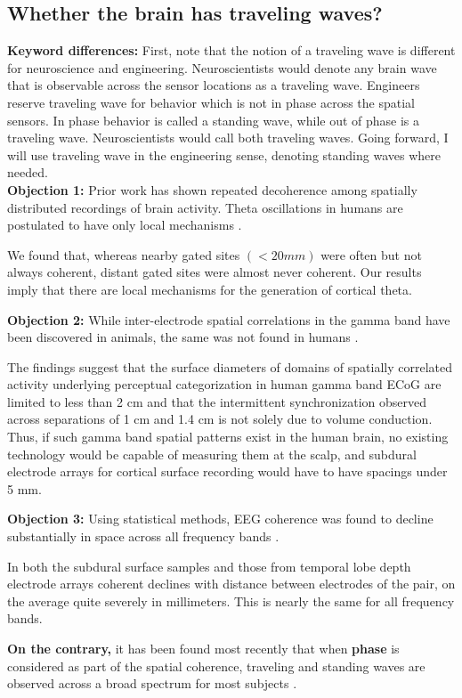 \subsection{Whether the brain has traveling waves?}
\textbf{Keyword differences:} First, note that the notion of a traveling wave is different for neuroscience and engineering. Neuroscientists would denote any brain wave that is observable across the sensor locations as a traveling wave. Engineers reserve traveling wave for behavior which is not in phase across the spatial sensors. In phase behavior is called a standing wave, while out of phase is a traveling wave. Neuroscientists would call both traveling waves. Going forward, I will use traveling wave in the engineering sense, denoting standing waves where needed. \\
\textbf{Objection 1:} Prior work has shown repeated decoherence among spatially distributed recordings of brain activity. Theta oscillations in humans are postulated to have only local mechanisms \cite{doi:10.1152/jn.00409.2005}. 
\begin{displayquote}
 We found that, whereas nearby gated sites $(<20 \textit{mm})$ were often but not always coherent, distant gated sites were almost never coherent. Our results imply that there are local mechanisms for the generation of cortical theta.
\end{displayquote}
\textbf{Objection 2:} While inter-electrode spatial correlations in the gamma band have been discovered in animals, the same was not found in humans \cite{MENON199689}.
\begin{displayquote}
The findings suggest that the surface diameters of domains of spatially correlated activity underlying perceptual categorization in human gamma band ECoG are limited to less than 2 cm and that the intermittent synchronization observed across separations of 1 cm and 1.4 cm is not solely due to volume conduction. Thus, if such gamma band spatial patterns exist in the human brain, no existing technology would be capable of measuring them at the scalp, and subdural electrode arrays for cortical surface recording would have to have spacings under 5 mm.
\end{displayquote}
\textbf{Objection 3:} Using statistical methods, EEG coherence was found to decline substantially in space across all frequency bands \cite{BULLOCK1995161}.
\begin{displayquote}
In both the subdural surface samples and those from temporal lobe depth electrode arrays coherent declines with distance between electrodes of the pair, on the average quite severely in millimeters. This is nearly the same for all frequency bands. 
\end{displayquote}
\textbf{On the contrary,} it has been found most recently that when \textbf{phase} is considered as part of the spatial coherence, traveling and standing waves are observed across a broad spectrum for most subjects \cite{ZHANG20181269}.\\

